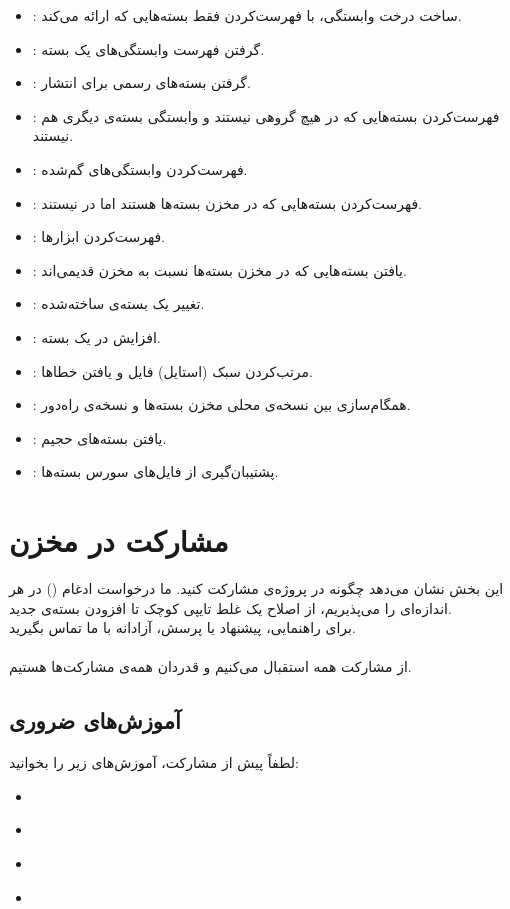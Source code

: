 \documentclass[a4paper, oneside, 11pt]{book}
\begin{document}
\begin{itemize}
\item {}: ساخت درخت وابستگی، با فهرست‌کردن فقط بسته‌هایی که 
    ارائه می‌کند.
\item {}: گرفتن فهرست وابستگی‌های  یک بسته.
\item {}: گرفتن بسته‌های رسمی برای انتشار.
\item {}: فهرست‌کردن بسته‌هایی که در هیچ گروهی نیستند و
    وابستگی بسته‌ی دیگری هم نیستند.
\item {}: فهرست‌کردن وابستگی‌های گم‌شده.
\item {}: فهرست‌کردن بسته‌هایی که در مخزن بسته‌ها هستند اما در 
    نیستند.
\item {}: فهرست‌کردن ابزارها.
\item {}: یافتن بسته‌هایی که در مخزن بسته‌ها نسبت به مخزن  قدیمی‌اند.
\item {}: تغییر یک بسته‌ی ساخته‌شده.
\item {}: افزایش  در یک بسته.
\item {}: مرتب‌کردن سبک (استایل) فایل  و یافتن خطاها.
\item {}: همگام‌سازی بین نسخه‌ی محلی مخزن بسته‌ها و نسخه‌ی راه‌دور.
\item {}: یافتن بسته‌های حجیم.
\item {}: پشتیبان‌گیری از فایل‌های سورس بسته‌ها.
\end{itemize}

\section{مشارکت در مخزن}
این بخش نشان می‌دهد چگونه در پروژه‌ی  مشارکت کنید. ما
درخواست ادغام () در هر اندازه‌ای را می‌پذیریم، از اصلاح یک غلط
تایپی کوچک تا افزودن بسته‌ی جدید.\\برای راهنمایی، پیشنهاد یا پرسش، آزادانه با
ما تماس بگیرید.
\\\\
از مشارکت همه استقبال می‌کنیم و قدردان همه‌ی مشارکت‌ها هستیم.

\subsection{آموزش‌های ضروری}
لطفاً پیش از مشارکت، آموزش‌های زیر را بخوانید:
\begin{itemize}
\item
\href{https://wiki.archlinux.org/index.php/Arch\_Packaging\_Standards)}{}
\item \href{https://wiki.archlinux.org/index.php/Creating\_Packages}{}
\item \href{https://wiki.archlinux.org/index.php/PKGBUILD}{}
\item \href{https://wiki.archlinux.org/index.php/Makepkg}{}
\end{itemize}
\end{document}
